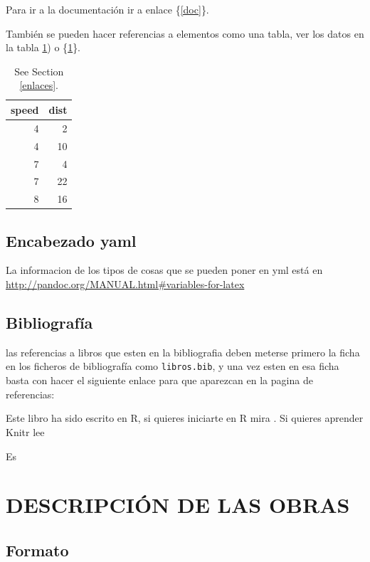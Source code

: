 \documentclass[10pt,spanish,a4paper,oneside]{article}
\begin{document}
Para ir a la documentación ir a enlace \{\ref{doc}\}.

También se pueden hacer referencias a elementos como una tabla, ver los
datos en la tabla \ref{tab:aTable}) o \{\ref{tab:aTable}\}.

\begin{table}

\caption{\label{tab:aTable}See Section \ref{enlaces}.}
\centering
\begin{tabular}[t]{r|r}
\hline
speed & dist\\
\hline
4 & 2\\
\hline
4 & 10\\
\hline
7 & 4\\
\hline
7 & 22\\
\hline
8 & 16\\
\hline
\end{tabular}
\end{table}

\subsection{\texorpdfstring{Encabezado yaml
\label{yaml1}}{Encabezado yaml }}\label{encabezado-yaml}

La informacion de los tipos de cosas que se pueden poner en yml está en
\url{http://pandoc.org/MANUAL.html\#variables-for-latex}

\subsection{\texorpdfstring{Bibliografía
\label{bib}}{Bibliografía }}\label{bibliografia}

las referencias a libros que esten en la bibliografia deben meterse
primero la ficha en los ficheros de bibliografía como
\texttt{libros.bib}, y una vez esten en esa ficha basta con hacer el
siguiente enlace para que aparezcan en la pagina de referencias:

Este libro ha sido escrito en R, si quieres iniciarte en R mira
\citep{R-Fer}. Si quieres aprender Knitr lee \citep{R-knitr}

Es

\section{\texorpdfstring{DESCRIPCIÓN DE LAS OBRAS
\label{des}}{DESCRIPCIÓN DE LAS OBRAS }}\label{descripcion-de-las-obras}

\subsection{Formato}\label{formato}
\end{document}

